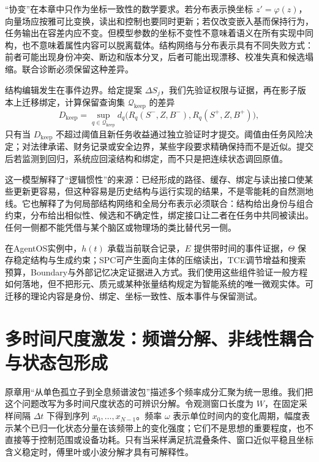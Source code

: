 “协变”在本章中只作为坐标一致性的数学要求。若分布表示换坐标 $z'=\varphi(z)$，向量场应按雅可比变换，读出和控制也要同时更新；若仅改变嵌入基而保持行为，任务输出在容差内应不变。但模型参数的坐标不变性不意味着语义在所有实现中同构，也不意味着属性内容可以脱离载体。结构网络与分布表示具有不同失败方式：前者可能出现身份冲突、断边和版本分叉，后者可能出现漂移、校准失真和候选塌缩。联合诊断必须保留这种差异。

结构编辑发生在事件边界。给定提案 $\Delta S_j$，我们先验证权限与证据，再在影子版本上迁移绑定，计算保留查询集 $\mathcal Q_{\mathrm{keep}}$ 的差异
\begin{equation}
 D_{\mathrm{keep}}=\sup_{q\in\mathcal Q_{\mathrm{keep}}}
 d_q\bigl(R_q(S^-,Z,B^-),R_q(S^+,Z,B^+)\bigr),
\end{equation}
只有当 $D_{\mathrm{keep}}$ 不超过阈值且新任务收益通过独立验证时才提交。阈值由任务风险决定；对法律承诺、财务记录或安全边界，某些字段要求精确保持而不是近似。提交后若监测到回归，系统应回滚结构和绑定，而不只是把连续状态调回原值。

这一模型解释了“逻辑惯性”的来源：已经形成的路径、缓存、绑定与读出接口使某些更新更容易，但这种容易是历史结构与运行实现的结果，不是零能耗的自然测地线。它也解释了为何局部结构网络和全局分布表示必须联合：结构给出身份与组合约束，分布给出相似性、候选和不确定性，绑定接口让二者在任务中共同被读出。任何一侧都不能凭借与某个脑区或物理场的类比替代另一侧。

在AgentOS实例中，$h(t)$ 承载当前联合记录，$E$ 提供带时间的事件证据，$\Theta$ 保存稳定结构与生成约束；SPC可产生面向主体的压缩读出，TCE调节增益和搜索预算，Boundary与外部记忆决定证据进入方式。我们使用这些组件验证一般方程如何落地，但不把形元、质元或某种张量结构规定为智能系统的唯一微观实体。可迁移的理论内容是身份、绑定、坐标一致性、版本事件与保留测试。

\section{多时间尺度激发：频谱分解、非线性耦合与状态包形成}
\label{sec:broadband_excitation}

原章用“从单色孤立子到全息频谱波包”描述多个频率成分汇聚为统一思维。我们把这个问题改写为多时间尺度状态的可辨识分解。令观测窗口长度为 $W$，在固定采样间隔 $\Delta t$ 下得到序列 $x_0,\ldots,x_{N-1}$。频率 $\omega$ 表示单位时间内的变化周期，幅度表示某个已归一化状态分量在该频带上的变化强度；它们不是思想的重要程度，也不直接等于控制范围或设备功耗。只有当采样满足抗混叠条件、窗口近似平稳且坐标含义稳定时，傅里叶或小波分解才具有可解释性。

